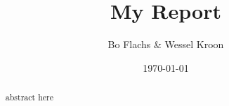 \documentclass[12pt,a4paper]{article}
\title{My Report}
\author{Bo Flachs \& Wessel Kroon}
\date{\today}
\begin{document}
\maketitle

\begin{abstract}
abstract here
\end{abstract}

\vfill

\tableofcontents

\clearpage























\end{document}
